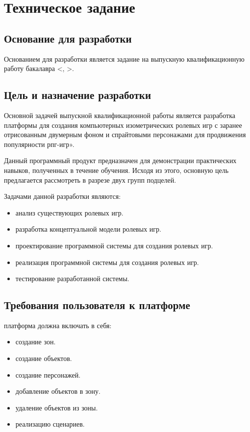 \section{Техническое задание}
\subsection{Основание для разработки}

Основанием для разработки является задание на выпускную квалификационную работу бакалавра < , >.

\subsection{Цель и назначение разработки}

Основной задачей выпускной квалификационной работы является разработка платформы для создания компьютерных изометрических ролевых игр с заранее отрисованным двумерным фоном и спрайтовыми персонажами для продвижения популярности рпг-игр».

Данный программный продукт предназначен для демонстрации практических навыков, полученных в течение обучения. Исходя из этого, основную цель предлагается рассмотреть в разрезе двух групп подцелей.

Задачами данной разработки являются:
\begin{itemize}
\item анализ существующих ролевых игр.
\item разработка концептуальной модели ролевых игр.
\item проектирование программной системы для создания ролевых игр.
\item реализация программной системы для создания ролевых игр.
\item тестирование разработанной системы.
\end{itemize}

\subsection{Требования пользователя к платформе}

платформа должна включать в себя:
\begin{itemize}
    \item создание зон.
    \item создание объектов.
    \item создание персонажей.
    \item добавление объектов в зону.
    \item удаление объектов из зоны.
    \item реализацию сценариев.
\end{itemize}

